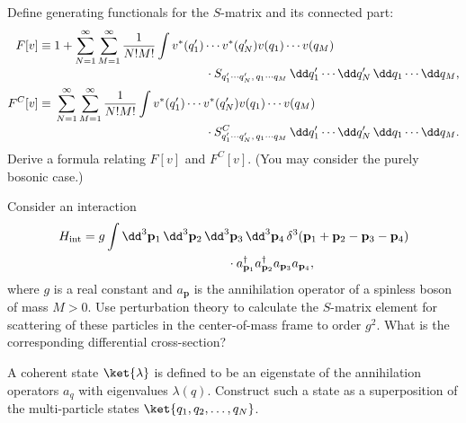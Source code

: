 
\begin{enumerate}
 Define generating functionals for the $S$-matrix and its connected part:
\begin{align*}
  F[v] \equiv {}& 1
    + \sum_{N=1}^{\infty}\sum_{M=1}^{\infty}\frac{1}{N!M!}
      \int v^*(q'_1)\cdots v^*(q'_N)v(q_1)\cdots v(q_M)
      \\[-2pt]
    &\hspace{44mm}{}
      \cdot S_{q'_1\cdots q'_N,\,q_1\cdots q_M}
      \,\dd q'_1\cdots \dd q'_N\,\dd q_1\cdots \dd q_M, \\
  F^{C}[v] \equiv {}&
    \sum_{N=1}^{\infty}\sum_{M=1}^{\infty}\frac{1}{N!M!}
      \int v^*(q'_1)\cdots v^*(q'_N)v(q_1)\cdots v(q_M)
      \\[-2pt]
    &\hspace{44mm}{}
      \cdot S^{C}_{q'_1\cdots q'_N,\,q_1\cdots q_M}
      \,\dd q'_1\cdots \dd q'_N\,\dd q_1\cdots \dd q_M.
\end{align*}
Derive a formula relating $F[v]$ and $F^{C}[v]$. (You may consider the
purely bosonic case.)

 Consider an interaction
\begin{align*}
  H_{\mathrm{int}} ={}& g\int \dd^3\mathbf{p}_1\,\dd^3\mathbf{p}_2\,
    \dd^3\mathbf{p}_3\,\dd^3\mathbf{p}_4\,
    \delta^3(\mathbf{p}_1+\mathbf{p}_2-\mathbf{p}_3-\mathbf{p}_4)
    \\
    &\hspace{36mm}{}
    \cdot a^{\dagger}_{\mathbf{p}_1} a^{\dagger}_{\mathbf{p}_2}
      a_{\mathbf{p}_3}a_{\mathbf{p}_4},
\end{align*}
where $g$ is a real constant and $a_{\mathbf{p}}$ is the annihilation operator
of a spinless boson of mass $M>0$. Use perturbation theory to calculate the
$S$-matrix element for scattering of these particles in the center-of-mass
frame to order $g^2$. What is the corresponding differential cross-section?

 A coherent state $\ket{\lambda}$ is defined to be an eigenstate of the
annihilation operators $a_q$ with eigenvalues $\lambda(q)$. Construct such a
state as a superposition of the multi-particle states
$\ket{q_1,q_2,\ldots,q_N}$.
\end{enumerate}
